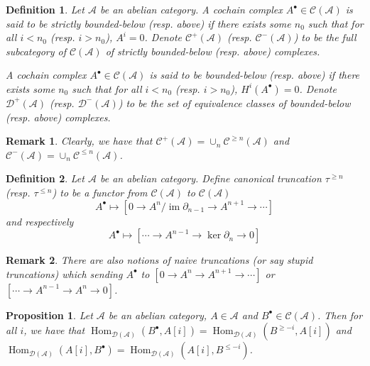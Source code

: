 \documentclass{ctexart}
\newtheorem{definition}{Definition}[section]
\newtheorem{remark}{Remark}[section]
\newtheorem{proposition}{Proposition}[section]
\renewcommand{\hom}{\operatorname{Hom}}
\newcommand{\im}{\operatorname{im}}
\begin{document}
\begin{definition}
    Let $\mathscr{A}$ be an abelian category.
    A cochain complex $A^{\bullet}\in \mathcal{C}(\mathscr{A})$ is said to be strictly bounded-below (resp. above) if there exists some $n_{0}$ such that for all $i < n_{0}$ (resp. $i > n_{0}$), $A^{i} = 0$.
    Denote $\mathcal{C}^{+}(\mathscr{A})$ (resp. $\mathcal{C}^{-}(\mathscr{A})$) to be the full subcategory of $\mathcal{C}(\mathscr{A})$ of strictly bounded-below (resp. above) complexes.
    \par
    A cochain complex $A^{\bullet}\in \mathcal{C}(\mathscr{A})$ is said to be bounded-below (resp. above) if there exists some $n_{0}$ such that for all $i < n_{0}$ (resp. $i > n_{0}$), $H^{i}(A^{\bullet}) = 0$.
    Denote $\mathcal{D}^{+}(\mathscr{A})$ (resp. $\mathcal{D}^{-}(\mathscr{A})$) to be the set of equivalence classes of bounded-below (resp. above) complexes.
\end{definition}
\begin{remark}
    Clearly, we have that $\mathcal{C}^{+}(\mathscr{A}) = \cup_{n} \mathcal{C}^{\ge n}(\mathscr{A})$ and $\mathcal{C}^{-}(\mathscr{A}) = \cup_{n} \mathcal{C}^{\le n}(\mathscr{A})$.
\end{remark}
\begin{definition}
    Let $\mathscr{A}$ be an abelian category.
    Define canonical truncation $\tau^{\ge n}$ (resp. $\tau^{\le n}$) to be a functor from $\mathcal{C}(\mathscr{A})$ to $\mathcal{C}(\mathscr{A})$
    \begin{equation*}
        A^{\bullet} \longmapsto [0 \rightarrow A^{n}/\im \partial_{n - 1} \rightarrow A^{n + 1} \rightarrow \cdots]
    \end{equation*}
    and respectively
    \begin{equation*}
        A^{\bullet} \longmapsto [\cdots \rightarrow A^{n - 1} \rightarrow \ker \partial_{n} \rightarrow 0]
    \end{equation*}
\end{definition}
\begin{remark}
    There are also notions of naive truncations (or say stupid truncations) which sending $A^{\bullet}$ to $[0 \rightarrow A^{n} \rightarrow A^{n + 1} \rightarrow \cdots]$ or $[\cdots \rightarrow A^{n - 1} \rightarrow A^{n} \rightarrow 0]$.
\end{remark}
\begin{proposition}
    Let $\mathscr{A}$ be an abelian category, $A\in \mathscr{A}$ and $B^{\bullet}\in \mathcal{C}(\mathscr{A})$.
    Then for all $i$, we have that $\hom_{\mathcal{D}(\mathscr{A})}(B^{\bullet}, A[i]) = \hom_{\mathcal{D}(\mathscr{A})}(B^{\ge -i}, A[i])$ and $\hom_{\mathcal{D}(\mathscr{A})}(A[i], B^{\bullet}) = \hom_{\mathcal{D}(\mathscr{A})}(A[i], B^{\le -i})$.
    \label{Proposition 6.2}
\end{proposition}
\end{document}
